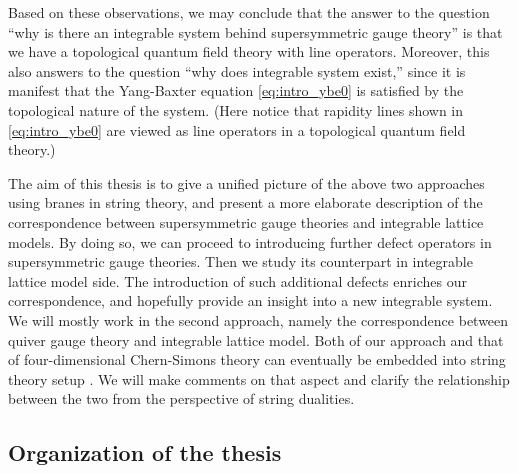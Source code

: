 Based on these observations, we may conclude that the answer to the question
``why is there an integrable system behind supersymmetric gauge theory'' is
that we have a topological quantum field theory with line operators.
Moreover, this also answers to the question ``why does integrable system exist,''
since it is manifest that the Yang-Baxter equation \eqref{eq:intro_ybe0} is
satisfied by the topological nature of the system. %
(Here notice that rapidity lines shown in \eqref{eq:intro_ybe0} are viewed as
line operators in a topological quantum field theory.)


The aim of this thesis is to give a unified picture of the above two approaches
using branes in string theory,
and present a more elaborate description of the correspondence between
supersymmetric gauge theories and integrable lattice models.
By doing so, we can proceed to introducing further defect operators in
supersymmetric gauge theories. Then we study its counterpart in integrable
lattice model side.
The introduction of such additional defects enriches our correspondence,
and hopefully provide an insight into a new integrable system.
We will mostly work in the second approach, namely the correspondence between
quiver gauge theory and integrable lattice model.
Both of our approach and that of four-dimensional Chern-Simons theory can eventually be
embedded into string theory setup \cite{Costello:2018txb}.
We will make comments on that aspect
and clarify the relationship between the two from the perspective of string dualities.







\subsection*{Organization of the thesis}


